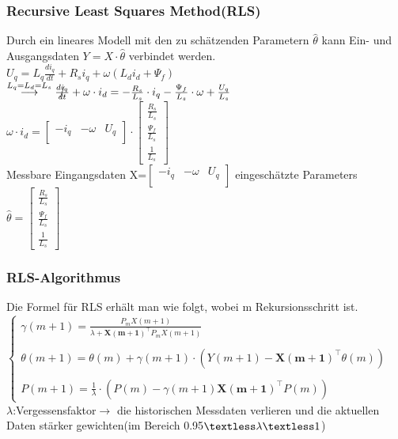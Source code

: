 \documentclass[serif,11pt, xcolor=table]{beamer}
\begin{document}
\begin{frame}
	\frametitle{Recursive Least Squares Method(RLS)}
	  
	\small{Durch ein lineares Modell mit den zu schätzenden Parametern $\hat{\theta}$ kann Ein- und Ausgangsdaten $Y=X\cdot\hat{\theta}$ verbindet werden.}\\
	\vskip 0.2cm
	$U_{q}=L_{q}\frac{di_{q}}{dt}+R_{s}i_{q}+\omega (L_{d}i_{d}+\Psi_{f})$\\
	$\stackrel{L_{q}=L_{d}=L_{s}}{\longrightarrow }\slashed{\frac{di_{q}}{dt}}+\omega \cdot i_{d}=-\frac{R_{s}}{L_{s}}\cdot i_{q}
	-\frac{\Psi_{f}}{L_{s}}\cdot\omega+\frac{U_{q}}{L_{s}}$\\
	\vskip 0.2cm
	\vskip 0.2cm
	$\omega\cdot i_{d}=\begin{bmatrix}
		-i_{q}&-\omega & U_{q}\\
	\end{bmatrix} \cdot \begin{bmatrix}
		\frac{R_{s}}{L_{s}}\\
		\frac{\Psi_{f}}{L_{s}}\\
		\frac{1}{L_{s}}
	\end{bmatrix}$\\
	\tiny{Messbare Eingangsdaten X=$\begin{bmatrix}
			-i_{q}&-\omega & U_{q}\\
		\end{bmatrix}$ eingeschätzte Parameters$\hat{\theta}=\begin{bmatrix}
			\frac{R_{s}}{L_{s}}\\
			\frac{\Psi_{f}}{L_{s}}\\
			\frac{1}{L_{s}}
	\end{bmatrix}$}
\end{frame}
\begin{frame}
\frametitle{RLS-Algorithmus}
 
\small{Die Formel für RLS erhält man wie folgt, wobei m Rekursionsschritt ist.} \\
\vskip 0.2cm
$\left\{\begin{array}{l} \gamma(m+1)=\frac{P_{m}X(m+1)}{\lambda+\mathbf{X(m+1)}^\intercal P_{m}X(m+1)}
\\
\\
	 \theta(m+1)= \theta(m)+\gamma(m+1) \cdot(Y(m+1)-\mathbf{X(m+1)}^\intercal \theta(m))
\\
\\
 P(m+1)=\frac{1}{\lambda}\cdot(P(m)-\gamma(m+1)\mathbf{X(m+1)}^\intercal P(m))
\end{array}\right.$\\
\vskip 0.2cm
$\lambda$:Vergessensfaktor$\longrightarrow$ die historischen Messdaten verlieren und die aktuellen Daten stärker gewichten(im Bereich 0.95$\textless\lambda\textless 1$)

\end{frame}
\end{document}
